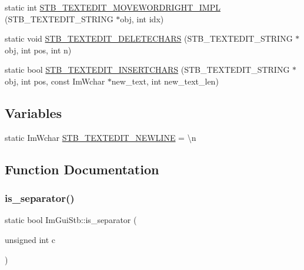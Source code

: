 \begin{DoxyCompactItemize}
\item 
static int \hyperlink{namespace_im_gui_stb_aadcf517e756dd59dd6da5502f38a836e}{S\+T\+B\+\_\+\+T\+E\+X\+T\+E\+D\+I\+T\+\_\+\+M\+O\+V\+E\+W\+O\+R\+D\+R\+I\+G\+H\+T\+\_\+\+I\+M\+PL} (S\+T\+B\+\_\+\+T\+E\+X\+T\+E\+D\+I\+T\+\_\+\+S\+T\+R\+I\+NG $\ast$obj, int idx)
\item 
static void \hyperlink{namespace_im_gui_stb_aa8e93b4c0311ac9f020fdd26d2652596}{S\+T\+B\+\_\+\+T\+E\+X\+T\+E\+D\+I\+T\+\_\+\+D\+E\+L\+E\+T\+E\+C\+H\+A\+RS} (S\+T\+B\+\_\+\+T\+E\+X\+T\+E\+D\+I\+T\+\_\+\+S\+T\+R\+I\+NG $\ast$obj, int pos, int n)
\item 
static bool \hyperlink{namespace_im_gui_stb_a10283229431fcccabb9a345a672ef9fb}{S\+T\+B\+\_\+\+T\+E\+X\+T\+E\+D\+I\+T\+\_\+\+I\+N\+S\+E\+R\+T\+C\+H\+A\+RS} (S\+T\+B\+\_\+\+T\+E\+X\+T\+E\+D\+I\+T\+\_\+\+S\+T\+R\+I\+NG $\ast$obj, int pos, const Im\+Wchar $\ast$new\+\_\+text, int new\+\_\+text\+\_\+len)
\end{DoxyCompactItemize}
\subsection*{Variables}
\begin{DoxyCompactItemize}
\item 
static Im\+Wchar \hyperlink{namespace_im_gui_stb_acb6d30da021dbff933ce94ce9ea738ac}{S\+T\+B\+\_\+\+T\+E\+X\+T\+E\+D\+I\+T\+\_\+\+N\+E\+W\+L\+I\+NE} = \textquotesingle{}\textbackslash{}n\textquotesingle{}
\end{DoxyCompactItemize}


\subsection{Function Documentation}
\hypertarget{namespace_im_gui_stb_ada7de5d22e36a0bb17592c27dbafc02d}{}\label{namespace_im_gui_stb_ada7de5d22e36a0bb17592c27dbafc02d} 
\subsubsection{\texorpdfstring{is\+\_\+separator()}{is\_separator()}}
{\footnotesize\ttfamily static bool Im\+Gui\+Stb\+::is\+\_\+separator (\begin{DoxyParamCaption}\item[{unsigned int}]{c }\end{DoxyParamCaption})\hspace{0.3cm}{\ttfamily [static]}}

